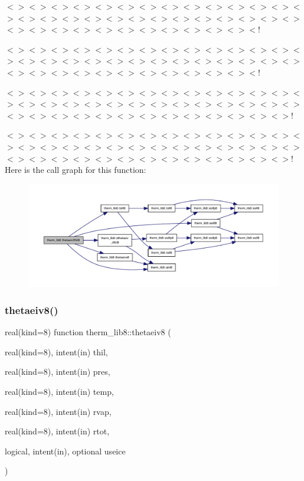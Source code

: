 $<$$>$$<$$>$$<$$>$$<$$>$$<$$>$$<$$>$$<$$>$$<$$>$$<$$>$$<$$>$$<$$>$$<$$>$$<$$>$$<$$>$$<$$>$$<$$>$$<$$>$$<$$>$$<$$>$$<$$>$$<$$>$$<$$>$$<$$>$$<$$>$$<$$>$$<$$>$$<$$>$$<$$>$$<$$>$$<$$>$$<$$>$$<$$>$$<$$>$$<$$>$$<$$>$$<$$>$$<$$>$$<$$>$$<$!

$<$$>$$<$$>$$<$$>$$<$$>$$<$$>$$<$$>$$<$$>$$<$$>$$<$$>$$<$$>$$<$$>$$<$$>$$<$$>$$<$$>$$<$$>$$<$$>$$<$$>$$<$$>$$<$$>$$<$$>$$<$$>$$<$$>$$<$$>$$<$$>$$<$$>$$<$$>$$<$$>$$<$$>$$<$$>$$<$$>$$<$$>$$<$$>$$<$$>$$<$$>$$<$$>$$<$$>$$<$$>$$<$$>$$<$!

$<$$>$$<$$>$$<$$>$$<$$>$$<$$>$$<$$>$$<$$>$$<$$>$$<$$>$$<$$>$$<$$>$$<$$>$$<$$>$$<$$>$$<$$>$$<$$>$$<$$>$$<$$>$$<$$>$$<$$>$$<$$>$$<$$>$$<$$>$$<$$>$$<$$>$$<$$>$$<$$>$$<$$>$$<$$>$$<$$>$$<$$>$$<$$>$$<$$>$$<$$>$$<$$>$$<$$>$$<$$>$$<$$>$$<$$>$$<$$>$!

$<$$>$$<$$>$$<$$>$$<$$>$$<$$>$$<$$>$$<$$>$$<$$>$$<$$>$$<$$>$$<$$>$$<$$>$$<$$>$$<$$>$$<$$>$$<$$>$$<$$>$$<$$>$$<$$>$$<$$>$$<$$>$$<$$>$$<$$>$$<$$>$$<$$>$$<$$>$$<$$>$$<$$>$$<$$>$$<$$>$$<$$>$$<$$>$$<$$>$$<$$>$$<$$>$$<$$>$$<$$>$$<$$>$$<$$>$$<$$>$! Here is the call graph for this function\+:
\nopagebreak
\begin{figure}[H]
\begin{center}
\leavevmode
\includegraphics[width=350pt]{namespacetherm__lib8_aeb2f84da15d0d99455778580d72dbde5_cgraph}
\end{center}
\end{figure}
\mbox{\label{namespacetherm__lib8_aca0eeff24415eab272c13efcba42ebd5}} 
\subsubsection{\texorpdfstring{thetaeiv8()}{thetaeiv8()}}
{\footnotesize\ttfamily real(kind=8) function therm\+\_\+lib8\+::thetaeiv8 (\begin{DoxyParamCaption}\item[{real(kind=8), intent(in)}]{thil,  }\item[{real(kind=8), intent(in)}]{pres,  }\item[{real(kind=8), intent(in)}]{temp,  }\item[{real(kind=8), intent(in)}]{rvap,  }\item[{real(kind=8), intent(in)}]{rtot,  }\item[{logical, intent(in), optional}]{useice }\end{DoxyParamCaption})}

